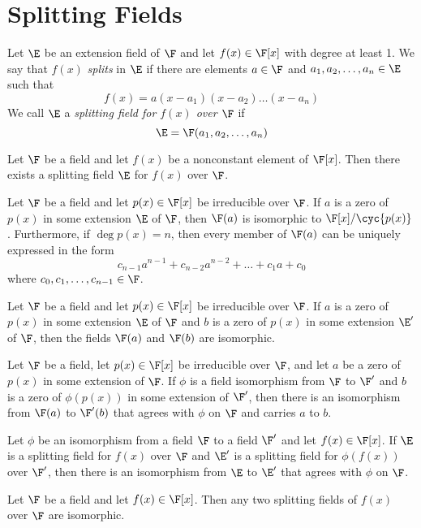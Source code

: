 \section{Splitting Fields}

\begin{definition}
	Let $\E$ be an extension field of $\F$ and let $f(x) \in \F[x]$ with degree at least 1. We say that $f(x)$ \textit{splits} in $\E$ if there are elements $a \in \F$ and $a_1,a_2,\dots,a_n \in \E$ such that
	\[ f(x) = a(x-a_1)(x-a_2)\dots(x-a_n) \]
	We call $\E$ a \textit{splitting field for $f(x)$ over $\F$} if
	\[ \E = \F(a_1,a_2,\dots,a_n) \]
\end{definition}

\begin{theorem}
	Let $\F$ be a field and let $f(x)$ be a nonconstant element of $\F[x]$. Then there exists a splitting field $\E$ for $f(x)$ over $\F$.
\end{theorem}

\begin{theorem}
	Let $\F$ be a field and let $p(x) \in \F[x]$ be irreducible over $\F$. If $a$ is a zero of $p(x)$ in some extension $\E$ of $\F$, then $\F(a)$ is isomorphic to $\F[x]/\cyc{p(x)}$. Furthermore, if $\deg p(x) = n$, then every member of $\F(a)$ can be uniquely expressed in the form
	\[ c_{n-1}a^{n-1}+c_{n-2}a^{n-2}+\dots+c_1a+c_0 \]
	where $c_0,c_1,\dots,c_{n-1} \in \F$.
\end{theorem}

\begin{corollary}
	Let $\F$ be a field and let $p(x) \in \F[x]$ be irreducible over $\F$. If $a$ is a zero of $p(x)$ in some extension $\E$ of $\F$ and $b$ is a zero of $p(x)$ in some extension $\E'$ of $\F$, then the fields $\F(a)$ and $\F(b)$ are isomorphic.
\end{corollary}

\begin{lemma}
	Let $\F$ be a field, let $p(x) \in \F[x]$ be irreducible over $\F$, and let $a$ be a zero of $p(x)$ in some extension of $\F$. If $\phi$ is a field isomorphism from $\F$ to $\F'$ and $b$ is a zero of $\phi(p(x))$ in some extension of $\F'$, then there is an isomorphism from $\F(a)$ to $\F'(b)$ that agrees with $\phi$ on $\F$ and carries $a$ to $b$.
\end{lemma}

\begin{theorem}
	Let $\phi$ be an isomorphism from a field $\F$ to a field $\F'$ and let $f(x) \in \F[x]$. If $\E$ is a splitting field for $f(x)$ over $\F$ and $\E'$ is a splitting field for $\phi(f(x))$ over $\F'$, then there is an isomorphism from $\E$ to $\E'$ that agrees with $\phi$ on $\F$.
\end{theorem}

\begin{corollary}
	Let $\F$ be a field and let $f(x) \in \F[x]$. Then any two splitting fields of $f(x)$ over $\F$ are isomorphic.
\end{corollary}
